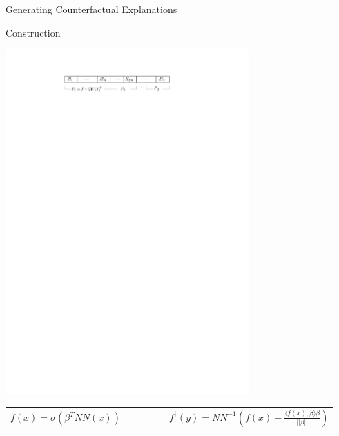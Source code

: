 \begin{frame}[standout]
	Generating Counterfactual Explanations
\end{frame}


\begin{frame}{Construction}
	\begin{center}
		\includegraphics[width=0.7\textwidth, page=2]{graphics}
	\end{center}


	\begin{center}
		\begin{tabular}{cc}
			$
			f(x) = \sigma \left ( \beta^T NN(x) \right) \qquad \qquad
			$ &
			$
			f^\dagger(y) = NN^{-1}\left( f(x) - \frac{\langle f(x), \beta\rangle \beta}{||\beta||}\right)
			$
		\end{tabular}
	\end{center}
\end{frame}

